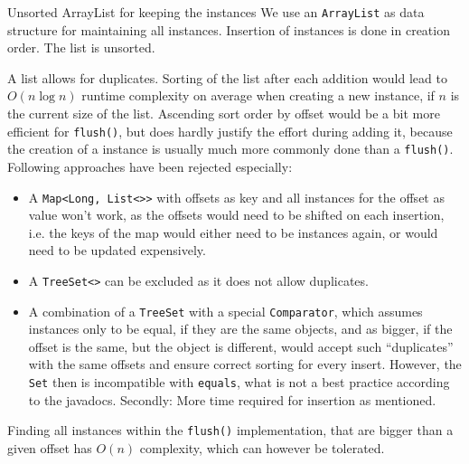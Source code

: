 {%
Unsorted ArrayList for keeping the \IMediumReference{} instances
}
{%
We use an \texttt{ArrayList} as data structure for maintaining all \IMediumReference{} instances. Insertion of \IMediumReference{} instances is done in creation order. The list is  unsorted.
}
{%
A list allows for duplicates. Sorting of the list after each addition would lead to $O(n\log n)$ runtime complexity on average when creating a new \IMediumReference{} instance, if $n$ is the current size of the list. Ascending sort order by offset would be a bit more efficient for \texttt{flush()}, but does hardly justify the effort during adding it, because the creation of a \IMediumReference{} instance is usually much more commonly done than a \texttt{flush()}. Following approaches have been rejected especially:
\begin{itemize}
\item A \texttt{Map<Long, List<\IMediumReference{}>}\texttt{>} with offsets as key and all \IMediumReference{} instances for the offset as value won't work, as the offsets would need to be shifted on each insertion, i.e. the keys of the map would either need to be \IMediumReference{} instances again, or would need to be updated expensively.
\item A \texttt{TreeSet<\IMediumReference{}>} can be excluded as it does not allow duplicates.
\item A combination of a \texttt{TreeSet} with a special \texttt{Comparator}, which assumes \IMediumReference{} instances only to be equal, if they are the same objects, and as bigger, if the offset is the same, but the object is different, would accept such ``duplicates'' with the same offsets and ensure correct sorting for every insert. However, the \texttt{Set} then is incompatible with \texttt{equals}, what is not a best practice according to the javadocs. Secondly: More time required for insertion as mentioned.
\end{itemize}
}
{%
Finding all \IMediumReference{} instances within the \texttt{flush()} implementation, that are bigger than a given offset has $O(n)$ complexity, which can however be tolerated.
}

